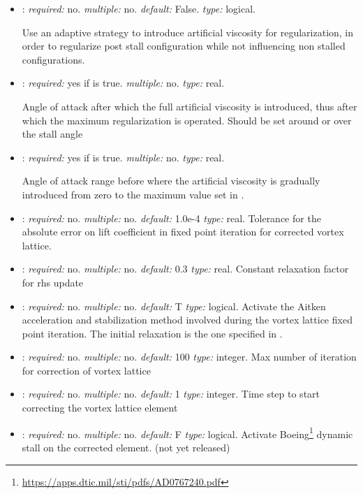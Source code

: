 \begin{itemize}
\item {}: \textit{required:} no. 
\textit{multiple:} no. \textit{default:} False. \textit{type:} logical.

Use an adaptive strategy to introduce artificial viscosity for regularization, 
in order to regularize post stall configuration while not influencing non 
stalled configurations. 

\item {}: \textit{required:} yes if 
 is true. \textit{multiple:} no. \textit{type:} real.

Angle of attack after which the full artificial viscosity is introduced, 
thus after which the maximum regularization is operated. Should be set 
around or over the stall angle

\item {}: \textit{required:} 
yes if  is true. \textit{multiple:} no. 
\textit{type:} real.

Angle of attack range before  
where the artificial viscosity is gradually introduced from zero to the maximum 
value set in .

\item {}: \textit{required:} no. \textit{multiple:} no. 
\textit{default:} 1.0e-4 \textit{type:} real. 
Tolerance for the absolute error on lift coefficient in fixed point 
iteration for corrected vortex lattice.

\item {}: \textit{required:} no. \textit{multiple:} no. 
\textit{default:} 0.3 \textit{type:} real. 
Constant relaxation factor for rhs update

\item {}: \textit{required:} no. \textit{multiple:} no. 
\textit{default:} T \textit{type:} logical. 
Activate the Aitken acceleration and stabilization method involved during the 
vortex lattice fixed point iteration. 
The initial relaxation is the one specified in . 

\item {}: \textit{required:} no. \textit{multiple:} no. 
\textit{default:} 100 \textit{type:} integer. 
Max number of iteration for correction of vortex lattice

\item {}: \textit{required:} no. \textit{multiple:} no. 
\textit{default:} 1 \textit{type:} integer. 
Time step to start correcting the vortex lattice element

\item {}: \textit{required:} no. \textit{multiple:} no. \textit{default:} F \textit{type:} logical. 
Activate Boeing\footnote{\url{https://apps.dtic.mil/sti/pdfs/AD0767240.pdf}} 
dynamic stall on the corrected  element.   (not yet released)


\end{itemize}

